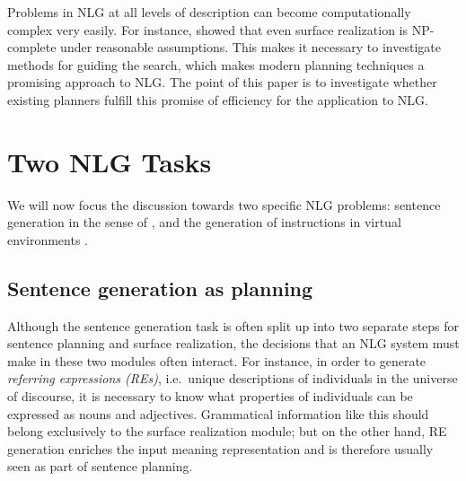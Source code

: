 \documentclass[letterpaper]{article}
\begin{document}
Problems in NLG at all levels of description can become
computationally complex very easily. For instance, \citet{KolStr02}
showed that even surface realization is NP-complete under reasonable
assumptions. This makes it necessary to investigate methods for
guiding the search, which makes modern planning techniques a promising
approach to NLG. The point of this paper is to investigate whether
existing planners fulfill this promise of efficiency for the
application to NLG.




\section{Two NLG Tasks}
\label{sec:domains}

We will now focus the discussion towards two specific NLG problems:
sentence generation in the sense of \cite{KolSto07}, and the
generation of instructions in virtual environments
\cite{ByrKolStrCasDalMooObe09}. 


\subsection{Sentence generation as planning}

Although the sentence generation task is often split up into two
separate steps for sentence planning and surface realization, the
decisions that an NLG system must make in these two modules often
interact. For instance, in order to generate \emph{referring
  expressions (REs)}, i.e.\ unique descriptions of individuals in the
universe of discourse, it is necessary to know what properties of
individuals can be expressed as nouns and adjectives. Grammatical
information like this should belong exclusively to the surface
realization module; but on the other hand, RE generation enriches the
input meaning representation and is therefore usually seen as part of
sentence planning.
\end{document}
